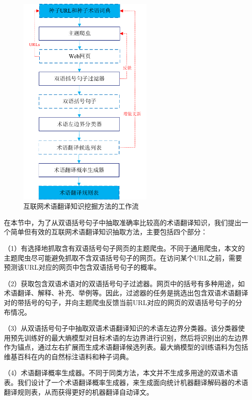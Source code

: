 \begin{figure}[!htb]
	\centering
	\includegraphics[width=0.6\textwidth]{Figure/Figure_4_4.pdf}
	\caption{互联网术语翻译知识挖掘方法的工作流}
	\label{Fig_term_extract_workflow}
\end{figure}

在本节中，为了从双语括号句子中抽取准确率比较高的术语翻译知识，我们提出一个简单但有效的互联网术语翻译知识抽取方法，主要包括四个部分：

（1）有选择地抓取含有双语括号句子网页的主题爬虫。不同于通用爬虫，本文的主题爬虫尽可能避免抓取不含双语括号句子的网页。在访问某个URL之前，需要预测该URL对应的网页中包含双语括号句子的概率。

（2）获取包含双语术语对的双语括号句子过滤器。网页中的括号有多种用途，如术语翻译、解释、补充、举例等。因此，过滤器的任务是挑选出包含双语术语翻译对的带括号的句子，并向主题爬虫反馈当前URL对应的网页的双语括号句子的分布情况。

（3）从双语括号句子中抽取双语术语翻译知识的术语左边界分类器。该分类器使用预先训练好的最大熵模型对目标术语的左边界进行识别，然后将识别出的左边界作为锚点，通过左右扩展而生成术语翻译候选列表。最大熵模型的训练语料为包括维基百科在内的自然标注语料和种子词典。

（4）术语翻译概率生成器。不同于同类方法，本文并不生成多用途的双语术语表。我们设计了一个术语翻译概率生成器，来生成面向统计机器翻译解码器的术语翻译规则表，从而获得更好的机器翻译自动译文。

